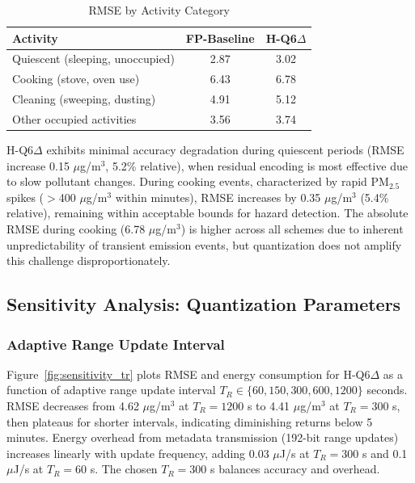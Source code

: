 \begin{table}[h]
\centering
\caption{RMSE by Activity Category}
\label{tab:activity_performance}
\begin{tabular}{lcc}
\toprule
\textbf{Activity} & \textbf{FP-Baseline} & \textbf{H-Q6$\Delta$} \\
\midrule
Quiescent (sleeping, unoccupied) & 2.87 & 3.02 \\
Cooking (stove, oven use) & 6.43 & 6.78 \\
Cleaning (sweeping, dusting) & 4.91 & 5.12 \\
Other occupied activities & 3.56 & 3.74 \\
\bottomrule
\end{tabular}
\end{table}

H-Q6$\Delta$ exhibits minimal accuracy degradation during quiescent periods (RMSE increase 0.15 $\mu$g/m$^3$, 5.2\% relative), when residual encoding is most effective due to slow pollutant changes. During cooking events, characterized by rapid PM$_{2.5}$ spikes ($>$400 $\mu$g/m$^3$ within minutes), RMSE increases by 0.35 $\mu$g/m$^3$ (5.4\% relative), remaining within acceptable bounds for hazard detection. The absolute RMSE during cooking (6.78 $\mu$g/m$^3$) is higher across all schemes due to inherent unpredictability of transient emission events, but quantization does not amplify this challenge disproportionately.

\subsection{Sensitivity Analysis: Quantization Parameters}

\subsubsection{Adaptive Range Update Interval}

Figure~\ref{fig:sensitivity_tr} plots RMSE and energy consumption for H-Q6$\Delta$ as a function of adaptive range update interval $T_R \in \{60, 150, 300, 600, 1200\}$ seconds. RMSE decreases from 4.62 $\mu$g/m$^3$ at $T_R = 1200$ s to 4.41 $\mu$g/m$^3$ at $T_R = 300$ s, then plateaus for shorter intervals, indicating diminishing returns below 5 minutes. Energy overhead from metadata transmission (192-bit range updates) increases linearly with update frequency, adding 0.03 $\mu$J/s at $T_R = 300$ s and 0.1 $\mu$J/s at $T_R = 60$ s. The chosen $T_R = 300$ s balances accuracy and overhead.

